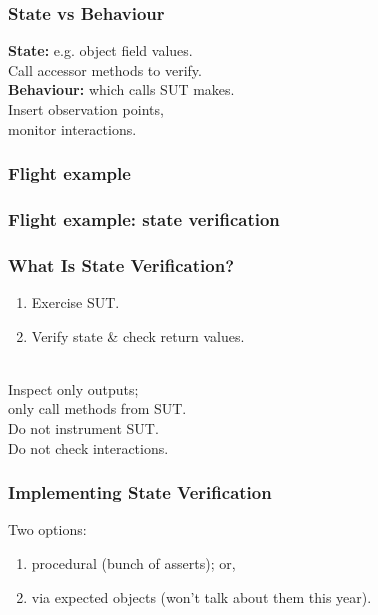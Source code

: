 \documentclass{beamer}
\newenvironment{changemargin}[1]{%
  \begin{list}{}{%
    \setlength{\topsep}{0pt}%
    \setlength{\leftmargin}{#1}%
    \setlength{\rightmargin}{1em}
    \setlength{\listparindent}{\parindent}%
    \setlength{\itemindent}{\parindent}%
    \setlength{\parsep}{\parskip}%
  }%
  \item[]}{\end{list}}
\begin{document}
\begin{frame}
  \frametitle{State vs Behaviour}

  \large
  \begin{changemargin}{2cm}
    {\bf State:} e.g. object field values.\\
    \hspace*{1.5cm}
    Call accessor methods to verify.\\[1em]
    {\bf Behaviour:} which calls SUT makes.\\
    \hspace*{1.5cm} Insert observation points, \\ \hspace*{1.5cm} monitor interactions.
  \end{changemargin}
\end{frame}

\begin{frame}
  \frametitle{Flight example}

  \small
    
\end{frame}

\begin{frame}
  \frametitle{Flight example: state verification}

  \small
    
\end{frame}

\begin{frame}
  \frametitle{What Is State Verification?}

  \Large
  \begin{changemargin}{2cm}
    \begin{enumerate}
    \item Exercise SUT.
    \item Verify state \& check return values.
    \end{enumerate}

    ~\\[1em]
    Inspect only outputs; \\ \hspace*{1cm} only call methods from SUT.\\[1em]
    Do not instrument SUT.\\[1em]
    Do not check interactions.
  \end{changemargin}
\end{frame}

\begin{frame}
  \frametitle{Implementing State Verification}

  \Large
  \begin{changemargin}{2cm}
    Two options:
    \begin{enumerate}
    \item procedural (bunch of asserts); or,
    \item via expected objects (won't talk about them this year).
    \end{enumerate}
  \end{changemargin}
\end{frame}
\end{document}
